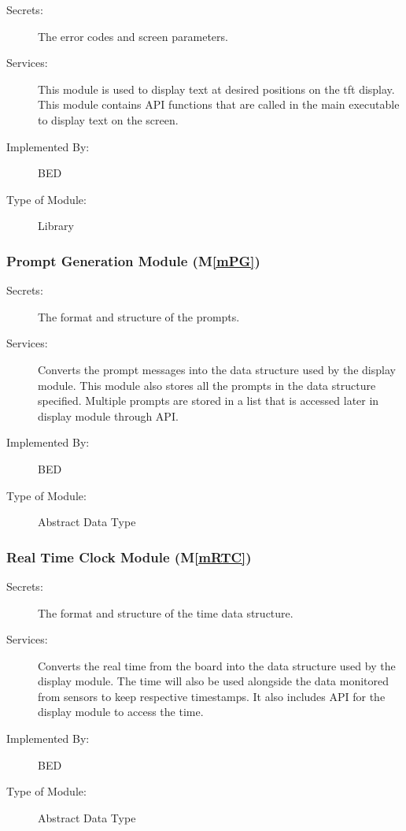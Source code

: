 \documentclass[12pt, titlepage]{article}
\newcommand{\mref}[1]{M\ref{#1}}
\begin{document}
\begin{description}
  \item[Secrets:]The error codes and screen parameters.
  \item[Services:] This module is used to display text at desired positions on the tft display.
    This module contains API functions that are called in the main executable to display text on the screen.
  \item[Implemented By:] BED
  \item[Type of Module:] Library
\end{description}

\subsubsection{Prompt Generation Module (\mref{mPG})}

\begin{description}
  \item[Secrets:]The format and structure of the prompts.
  \item[Services:] Converts the prompt messages into the data structure used by the
    display module. This module also stores all the prompts in the data structure specified. Multiple prompts are stored in a list that is accessed later in display module through API.
  \item[Implemented By:] BED
  \item[Type of Module:] Abstract Data Type
\end{description}

\subsubsection{Real Time Clock Module (\mref{mRTC})}

\begin{description}
  \item[Secrets:]The format and structure of the time data structure.
  \item[Services:] Converts the real time from the board into the data structure used by the
    display module. The time will also be used alongside the data monitored from sensors to keep respective timestamps. It also includes API for the display module to access the time.
  \item[Implemented By:] BED
  \item[Type of Module:] Abstract Data Type
\end{description}
\end{document}

